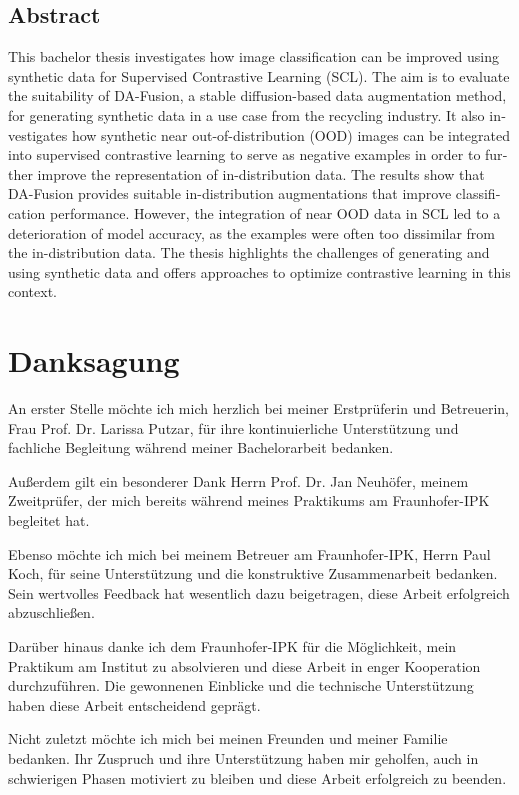 {
  \begin{otherlanguage}{english}
    \section*{Abstract}

      This bachelor thesis investigates how image classification can be improved using synthetic data for Supervised Contrastive Learning (SCL). The aim is to evaluate the suitability of DA-Fusion, a stable diffusion-based data augmentation method, for generating synthetic data in a use case from the recycling industry. It also investigates how synthetic near out-of-distribution (OOD) images can be integrated into supervised contrastive learning to serve as negative examples in order to further improve the representation of in-distribution data. The results show that DA-Fusion provides suitable in-distribution augmentations that improve classification performance. However, the integration of near OOD data in SCL led to a deterioration of model accuracy, as the examples were often too dissimilar from the in-distribution data. The thesis highlights the challenges of generating and using synthetic data and offers approaches to optimize contrastive learning in this context.
  \end{otherlanguage}
}

\newpage
\thispagestyle{empty}

\chapter*{Danksagung}

An erster Stelle möchte ich mich herzlich bei meiner Erstprüferin und Betreuerin, Frau Prof. Dr. Larissa Putzar, für ihre kontinuierliche Unterstützung und fachliche Begleitung während meiner Bachelorarbeit bedanken.

Außerdem gilt ein besonderer Dank Herrn Prof. Dr. Jan Neuhöfer, meinem Zweitprüfer, der mich bereits während meines Praktikums am Fraunhofer-IPK begleitet hat.

Ebenso möchte ich mich bei meinem Betreuer am Fraunhofer-IPK, Herrn Paul Koch, für seine Unterstützung und die konstruktive Zusammenarbeit bedanken. Sein wertvolles Feedback hat wesentlich dazu beigetragen, diese Arbeit erfolgreich abzuschließen.

Darüber hinaus danke ich dem Fraunhofer-IPK für die Möglichkeit, mein Praktikum am Institut zu absolvieren und diese Arbeit in enger Kooperation durchzuführen. Die gewonnenen Einblicke und die technische Unterstützung haben diese Arbeit entscheidend geprägt.

Nicht zuletzt möchte ich mich bei meinen Freunden und meiner Familie bedanken. Ihr Zuspruch und ihre Unterstützung haben mir geholfen, auch in schwierigen Phasen motiviert zu bleiben und diese Arbeit erfolgreich zu beenden.